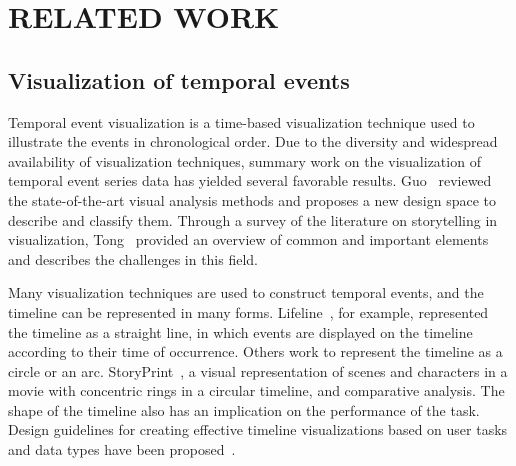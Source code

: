 	
	
	
\section{RELATED WORK} %

\subsection{Visualization of temporal events}%
\noindent Temporal event visualization is a time-based visualization technique used to illustrate the events in chronological order. Due to the diversity and widespread availability of visualization techniques, summary work on the visualization of temporal event series data has yielded several favorable results. Guo~\cite{guo_survey_2021} reviewed the state-of-the-art visual analysis methods and proposes a new design space to describe and classify them. Through a survey of the literature on storytelling in visualization, Tong~\cite{tong_storytelling_2018} provided an overview of common and important elements and describes the challenges in this field.

Many visualization techniques are used to construct temporal events, and the timeline can be represented in many forms. Lifeline~\cite{plaisant_lifelines_2003}, for example, represented the timeline as a straight line, in which events are displayed on the timeline according to their time of occurrence. Others work to represent the timeline as a circle or an arc. StoryPrint~\cite{watson_storyprint_2019}, a visual representation of scenes and characters in a movie with concentric rings in a circular timeline, and comparative analysis. The shape of the timeline also has an implication on the performance of the task. Design guidelines for creating effective timeline visualizations based on user tasks and data types have been proposed~\cite{di_bartolomeo_evaluating_2020}.

